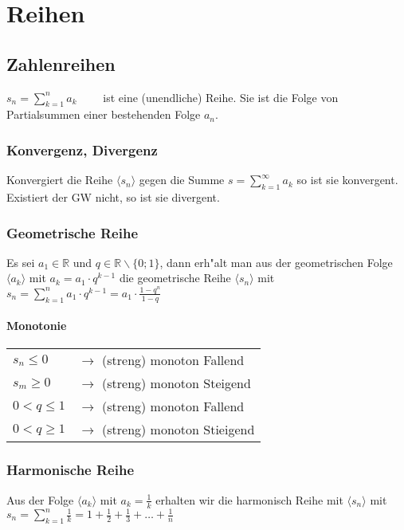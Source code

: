 \section{Reihen}

\subsection{Zahlenreihen}
  $ s_n = \sum\limits_{k=1}^{n} a_k \qquad $ ist eine (unendliche) Reihe. Sie
  ist die Folge von Partialsummen einer bestehenden Folge $a_n$.

\subsubsection{Konvergenz, Divergenz}
Konvergiert die Reihe $\langle s_n \rangle$ gegen die Summe $ s =
\sum\limits_{k=1}^{\infty} a_k $ so ist sie konvergent. Existiert der GW nicht, so ist sie divergent.

\subsubsection{Geometrische Reihe}
Es sei $a_1\in\mathbb R$ und $q\in\mathbb R \backslash \{0;1\}$, dann erh"alt
man aus der geometrischen Folge $\langle a_k \rangle$ mit $a_k=a_1 \cdot
q^{k-1}$ die geometrische Reihe $\langle s_n \rangle$ mit
\textbf{$s_n= \sum\limits_{k=1}^{n} a_1 \cdot q^{k-1}=a_1 \cdot
\frac{1-q^n}{1-q}$\\}
\paragraph{Monotonie}
\begin{tabular}{ll}
$s_n \leq 0$&$\to$ (streng) monoton Fallend\\
$s_m \geq 0$&$\to$ (streng) monoton Steigend\\
$0 < q \leq 1$&$\to$ (streng) monoton Fallend\\
$0 < q \geq 1$&$\to$ (streng) monoton Stieigend\\
\end{tabular}

\subsubsection{Harmonische Reihe}
Aus der Folge $\langle a_k \rangle$ mit $a_k=\frac{1}{k}$ erhalten wir die
harmonisch Reihe mit $\langle s_n \rangle$ mit
\textbf{$s_n=\sum\limits_{k=1}^{n}
\frac{1}{k}=1+\frac{1}{2}+\frac{1}{3}+\dotsc+\frac{1}{n}$}
